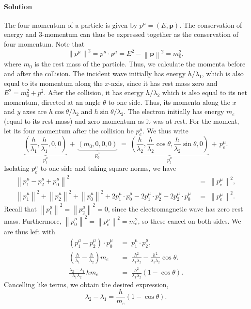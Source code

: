 \documentclass[10pt]{article}
\let\vec\boldsymbol
\newcommand\norm[1]{\left\lVert#1\right\rVert}
\def\solution{\paragraph{Solution}}
\begin{document}
        \solution The four momentum of a particle is given by $p^\mu = (E, \vec{p})$. The conservation of energy and 3-momentum can thus
        be expressed together as the conservation of four momentum. Note that
        \[
                \norm{p^\mu}^2 = p^\mu\cdot p^\mu = E^2 - \norm{\vec{p}}^2 = m_0^2,
        \]
        where $m_0$ is the rest mass of the particle. Thus, we calculate the momenta before and after the collision.
        The incident wave initially has energy $h /\lambda_1$, which is also equal to its momentum along the $x$-axis, since
        it has rest mass zero and $E^2 = m_0^2 + p^2$. After the collision, it has energy $h /\lambda_2$ which is also equal to 
        its net momentum, directed at an angle $\theta$ to one side. Thus, its momenta along the $x$ and $y$ axes are $h\cos\theta /\lambda_2$
        and $h\sin\theta /\lambda_2$. The electron initially has energy $m_e$ (equal to its rest mass) and zero momentum as it was at rest.
        For the moment, let its four momentum after the collision be $p_e^\mu$. We thus write
        \[
                \underbrace{\left( \frac{h}{\lambda_1}, \frac{h}{\lambda_1}, 0, 0 \right)}_{p_1^\mu} \,+\, 
                        \underbrace{\left( m_0, 0, 0, 0 \right)}_{p_0^\mu} \;=\;
                        \underbrace{\left( \frac{h}{\lambda_2}, \frac{h}{\lambda_2}\cos\theta, \frac{h}{\lambda_2}\sin\theta, 0 \right)}_{p_2^\mu} 
                                \,+\, p_e^\mu.
        \]
        Isolating $p_e^\mu$ to one side and taking square norms, we have
        \begin{align*}
                \norm{p_1^\mu - p_2^\mu + p_0^\mu}^2 \;&=\; \norm{p_e^\mu}^2, \\
                \norm{p_1^\mu}^2 + \norm{p_2^\mu}^2 + \norm{p_0^\mu}^2 + 2p_1^\mu\cdot p_0^\mu - 2p_1^\mu\cdot p_2^\mu - 2p_2^\mu\cdot p_0^\mu
                        \;&=\; \norm{p_e^\mu}^2.
        \end{align*}
        Recall that $\norm{p_1^\mu}^2 = \norm{p_2^\mu}^2 = 0$, since the electromagnetic wave has zero rest mass. Furthermore, 
        $\norm{p_0^\mu}^2 = \norm{p_e^\mu}^2 = m_e^2$, so these cancel on both sides. We are thus left with
        \begin{align*}
                (p_1^\mu - p_2^\mu)\cdot p_0^\mu \;&=\; p_1^\mu \cdot p_2^\mu, \\
                \left(\frac{h}{\lambda_1} - \frac{h}{\lambda_2}\right)m_e \;&=\; \frac{h^2}{\lambda_1\lambda_2} - 
                        \frac{h^2}{\lambda_1\lambda_2}\cos\theta. \\
                \frac{\lambda_2 - \lambda_1}{\lambda_1\lambda_2}\, hm_e \;&=\; \frac{h^2}{\lambda_1\lambda_2}(1 - \cos\theta).
        \end{align*}
        Cancelling like terms, we obtain the desired expression,
        \[
                \lambda_2 - \lambda_1 = \frac{h}{m_e}(1 - \cos\theta).
        \]
\end{document}
